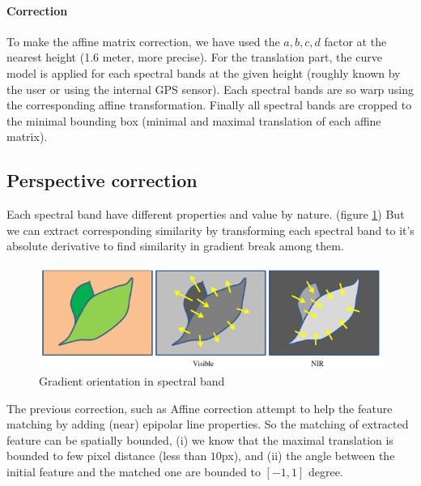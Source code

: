 \documentclass[]{elsarticle}
\begin{document}
	\paragraph{Correction}
	To make the affine matrix correction, we have used the $a,b,c,d$ factor at the nearest height (1.6 meter, more precise).
	For the translation part, the curve model is applied for each spectral bands at the given height (roughly known by the user or using the internal GPS sensor).
	Each spectral bands are so warp using the corresponding affine transformation.
	Finally all spectral bands are cropped to the minimal bounding box (minimal and maximal translation of each affine matrix).
	
	\subsection{Perspective correction}
	
	Each spectral band have different properties and value by nature. (figure \ref{fig:vegetable-gradient})
	But we can extract corresponding similarity by transforming each spectral band to it's absolute derivative
	to find similarity in gradient break among them.
	
	\begin{figure}[!htb]
		\centering
		\includegraphics[width=\linewidth]{../figures/contrast-inversion.png}
		\caption{Gradient orientation in spectral band \cite{rabatel:hal-01684135}}
		\label{fig:vegetable-gradient}
	\end{figure}
	
	\par The previous correction, such as Affine correction attempt to help the feature matching by adding (near) epipolar line properties.
	So the matching of extracted feature can be spatially bounded,
	(i) we know that the maximal translation is bounded to few pixel distance (less than $10$px),
	and (ii) the angle between the initial feature and the matched one are bounded to $[-1,1]$ degree.
	
\end{document}
